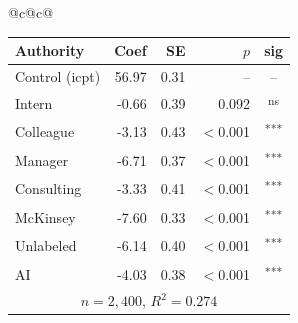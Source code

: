 \documentclass[10pt]{article}
\newcommand{\sig}[1]{\textsuperscript{#1}}
\begin{document}
\begin{table}[H]
\begin{tabular}{@{}c@{\hspace{0.5em}}c@{}}
\begin{minipage}[t]{0.49\textwidth}
\begin{tabular}{@{}l r r r c@{}}
\toprule
Authority & Coef & SE & $p$ & sig \\
\midrule
\cellcolor{gray!22}Control (icpt) & \cellcolor{gray!22}56.97 & \cellcolor{gray!22}0.31 & \cellcolor{gray!22}-- & \cellcolor{gray!22}-- \\
\midrule
Intern & -0.66 & 0.39 & 0.092 & \sig{ns} \\
Colleague & -3.13 & 0.43 & $<$0.001 & \sig{***} \\
Manager & -6.71 & 0.37 & $<$0.001 & \sig{***} \\
\midrule
Consulting & -3.33 & 0.41 & $<$0.001 & \sig{***} \\
McKinsey & -7.60 & 0.33 & $<$0.001 & \sig{***} \\
\midrule
Unlabeled & -6.14 & 0.40 & $<$0.001 & \sig{***} \\
AI & -4.03 & 0.38 & $<$0.001 & \sig{***} \\
\midrule
\multicolumn{5}{c}{\scriptsize $n=2{,}400$, $R^2=0.274$} \\
\bottomrule\end{tabular}
\end{minipage} \\
\end{tabular}
\end{table}
\end{document}
